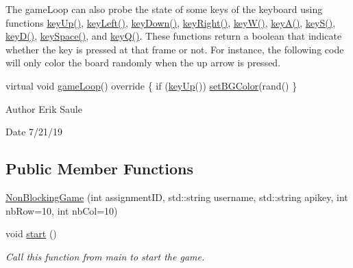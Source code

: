 The game\+Loop can also probe the state of some keys of the keyboard using functions \hyperlink{classbridges_1_1game_1_1_non_blocking_game_a0a93cf74e7eac55c33f76cd55d525084}{key\+Up()}, \hyperlink{classbridges_1_1game_1_1_non_blocking_game_a9b7ba679dd177b28f84ea24b9924a51c}{key\+Left()}, \hyperlink{classbridges_1_1game_1_1_non_blocking_game_a52dd79aaaee9da77fa392fb8ec37fa94}{key\+Down()}, \hyperlink{classbridges_1_1game_1_1_non_blocking_game_afbea1fa2acec16e952be66ce76d496a9}{key\+Right()}, \hyperlink{classbridges_1_1game_1_1_non_blocking_game_a7bd5c2ab845e24525649dda7f8dfd460}{key\+W()}, \hyperlink{classbridges_1_1game_1_1_non_blocking_game_af88089437e34df580b247cb27047fd14}{key\+A()}, \hyperlink{classbridges_1_1game_1_1_non_blocking_game_a75ece5d4fa35893ecacc82c5064c05e0}{key\+S()}, \hyperlink{classbridges_1_1game_1_1_non_blocking_game_a932979445cc8acea618092b83b4a9756}{key\+D()}, \hyperlink{classbridges_1_1game_1_1_non_blocking_game_a54beca154b58b0e0fb26c75983ba5072}{key\+Space()}, and \hyperlink{classbridges_1_1game_1_1_non_blocking_game_af0dafefbad315fbfb01851a4a0dfa93e}{key\+Q()}. These functions return a boolean that indicate whether the key is pressed at that frame or not. For instance, the following code will only color the board randomly when the up arrow is pressed.


\begin{DoxyCode}
\textcolor{keyword}{virtual} \textcolor{keywordtype}{void} \hyperlink{classbridges_1_1game_1_1_game_base_a16fb787bc65be1a582cddcfba3a0c5bb}{gameLoop}()\textcolor{keyword}{ override }\{
  \textcolor{keywordflow}{if} (\hyperlink{classbridges_1_1game_1_1_non_blocking_game_a0a93cf74e7eac55c33f76cd55d525084}{keyUp}())
    \hyperlink{classbridges_1_1game_1_1_game_base_ab667bbca1c81e5fb3aa8d81d70fe8cd2}{setBGColor}(rand()%
\}
\end{DoxyCode}


\begin{DoxyAuthor}{Author}
Erik Saule 
\end{DoxyAuthor}
\begin{DoxyDate}{Date}
7/21/19 
\end{DoxyDate}
\subsection*{Public Member Functions}
\begin{DoxyCompactItemize}
\item 
\hyperlink{classbridges_1_1game_1_1_non_blocking_game_a3226aa7e7ff129e916f4bd5aabcb2e72}{Non\+Blocking\+Game} (int assignment\+ID, std\+::string username, std\+::string apikey, int nb\+Row=10, int nb\+Col=10)
\item 
void \hyperlink{classbridges_1_1game_1_1_non_blocking_game_ab48a0d690368bb8ff7b02aad0b6f336e}{start} ()
\begin{DoxyCompactList}\small\item\em Call this function from main to start the game. \end{DoxyCompactList}\end{DoxyCompactItemize}

